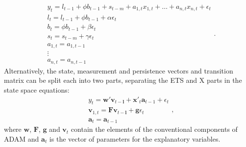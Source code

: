 \documentclass[]{book}
\theoremstyle{definition}
\theoremstyle{definition}
\theoremstyle{definition}
\theoremstyle{definition}
\theoremstyle{remark}
\begin{document}
\begin{equation}
  \begin{aligned}
    & y_{t} = l_{t-1} + \phi b_{t-1} + s_{t-m} + a_{1,t} x_{1,t} + \dots + a_{n,t} x_{n,t} + \epsilon_t \\
    & l_t = l_{t-1} + \phi b_{t-1} + \alpha \epsilon_t \\
    & b_t = \phi b_{t-1} + \beta \epsilon_t \\
    & s_t = s_{t-m} + \gamma \epsilon_t \\
    & a_{1,t} = a_{1,t-1} \\
    & \vdots \\
    & a_{n,t} = a_{n,t-1}
  \end{aligned}.
  \label{eq:ETSXADAMAAA}
\end{equation}
Alternatively, the state, measurement and persistence vectors and transition matrix can be split each into two parts, separating the ETS and X parts in the state space equations:
\begin{equation}
  \begin{aligned}
    & {y}_{t} = \mathbf{w}' \mathbf{v}_{t-\mathbf{l}} + \mathbf{x}'_{t} \mathbf{a}_{t-1} + \epsilon_t \\
    & \mathbf{v}_{1,t} = \mathbf{F} \mathbf{v}_{t-\mathbf{l}} + \mathbf{g} \epsilon_t \\
    & \mathbf{a}_{t} = \mathbf{a}_{t-1}
  \end{aligned} ,
  \label{eq:ETSXADAMStateSpacePureAdditiveFullAlternative}
\end{equation}
where \(\mathbf{w}\), \(\mathbf{F}\), \(\mathbf{g}\) and \(\mathbf{v}_{t}\) contain the elements of the conventional components of ADAM and \(\mathbf{a}_{t}\) is the vector of parameters for the explanatory variables.
\end{document}
